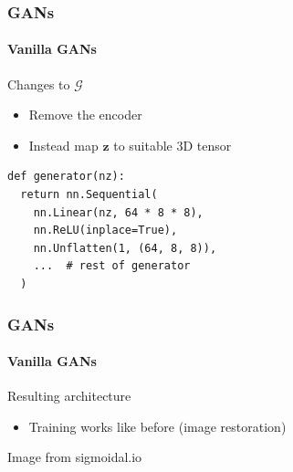 \documentclass[xetex,professionalfont]{beamer}
\renewcommand{\vec}[1]{\ensuremath{\mathbf{#1}}}
\newcommand{\vz}{\vec{z}}
\newcommand{\cG}{\mathcal{G}}
\begin{document}
\begin{frame}[fragile]
	\frametitle{GANs}
	\framesubtitle{Vanilla GANs}

	Changes to $\cG$
	\begin{itemize}
		\item Remove the encoder
		\item Instead map $\vz$ to suitable 3D tensor
	\end{itemize}

	\medskip

	\begin{verbatim}
def generator(nz):
  return nn.Sequential(
    nn.Linear(nz, 64 * 8 * 8),
    nn.ReLU(inplace=True),
    nn.Unflatten(1, (64, 8, 8)),
    ...  # rest of generator
  )
\end{verbatim}

\end{frame}


\begin{frame}
	\frametitle{GANs}
	\framesubtitle{Vanilla GANs}

	Resulting architecture
	\begin{itemize}
		\item Training works like before (image restoration)
	\end{itemize}

	\medskip

	\begin{center}
		{\centering Image from sigmoidal.io}
	\end{center}

\end{frame}
\end{document}
